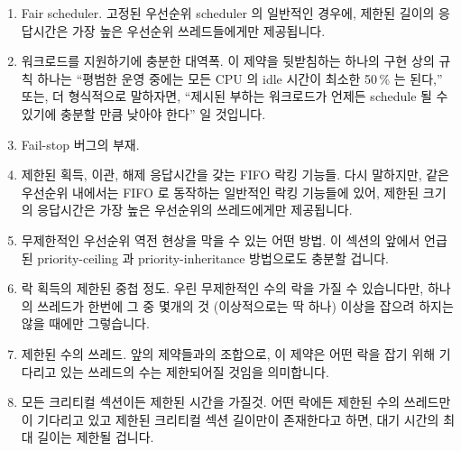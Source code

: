 \begin{enumerate}
\item	Fair scheduler.
	고정된 우선순위 scheduler 의 일반적인 경우에, 제한된 길이의 응답시간은
	가장 높은 우선순위 쓰레드들에게만 제공됩니다.
\item	워크로드를 지원하기에 충분한 대역폭.
	이 제약을 뒷받침하는 하나의 구현 상의 규칙 하나는 ``평범한 운영 중에는
	모든 CPU 의 idle 시간이 최소한 50\,\% 는 된다,'' 또는, 더 형식적으로
	말하자면, ``제시된 부하는 워크로드가 언제든 schedule 될 수 있기에
	충분할 만큼 낮아야 한다'' 일 것입니다.
\item	Fail-stop 버그의 부재.
\item	제한된 획득, 이관, 해제 응답시간을 갖는 FIFO 락킹 기능들.
	다시 말하지만, 같은 우선순위 내에서는 FIFO 로 동작하는 일반적인 락킹
	기능들에 있어, 제한된 크기의 응답시간은 가장 높은 우선순위의
	쓰레드에게만 제공됩니다.
\item	무제한적인 우선순위 역전 현상을 막을 수 있는 어떤 방법.
	이 섹션의 앞에서 언급된 priority-ceiling 과 priority-inheritance
	방법으로도 충분할 겁니다.
\item	락 획득의 제한된 중첩 정도.
	우린 무제한적인 수의 락을 가질 수 있습니다만, 하나의 쓰레드가 한번에 그
	중 몇개의 것 (이상적으로는 딱 하나) 이상을 잡으려 하지는 않을 때에만
	그렇습니다.
\item	제한된 수의 쓰레드.
	앞의 제약들과의 조합으로, 이 제약은 어떤 락을 잡기 위해 기다리고 있는
	쓰레드의 수는 제한되어질 것임을 의미합니다.
\item	모든 크리티컬 섹션이든 제한된 시간을 가질것.
	어떤 락에든 제한된 수의 쓰레드만이 기다리고 있고 제한된 크리티컬 섹션
	길이만이 존재한다고 하면, 대기 시간의 최대 길이는 제한될 겁니다.
\iffalse


\end{enumerate}
